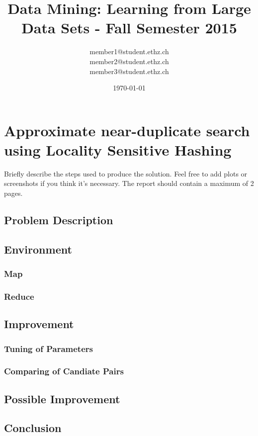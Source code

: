 \documentclass[a4paper, 11pt]{article}
\title{Data Mining: Learning from Large Data Sets - Fall Semester 2015}
\author{member1@student.ethz.ch\\ member2@student.ethz.ch\\ member3@student.ethz.ch\\}
\date{\today}
\begin{document}
\maketitle

\section*{Approximate near-duplicate search using Locality Sensitive Hashing} 
Briefly describe the steps used to produce the solution. Feel
free to add plots or screenshots if you think it's necessary. The
report should contain a maximum of 2 pages.

\subsection{Problem Description}

\subsection{Environment}

\subsubsection{Map}

\subsubsection{Reduce}


\subsection{Improvement}

\subsubsection{Tuning of Parameters}

\subsubsection{Comparing of Candiate Pairs}

\subsection{Possible Improvement}

\subsection{Conclusion}
\end{document}
